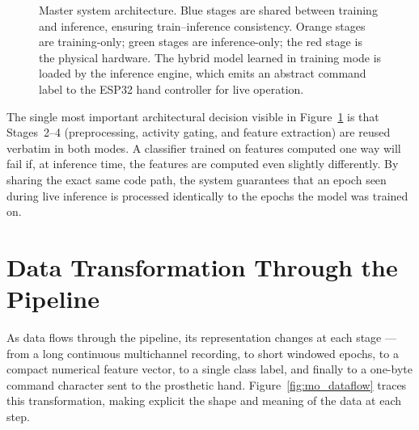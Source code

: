 \begin{figure}[htbp]
\caption{Master system architecture. Blue stages are shared between
training and inference, ensuring train--inference consistency.
Orange stages are training-only; green stages are inference-only;
the red stage is the physical hardware. The hybrid model learned in
training mode is loaded by the inference engine, which emits an
abstract command label to the ESP32 hand controller for live
operation.}
\label{fig:mo_master}
\end{figure}

The single most important architectural decision visible in
Figure~\ref{fig:mo_master} is that Stages~2--4 (preprocessing,
activity gating, and feature extraction) are reused verbatim in
both modes. A classifier trained on features computed one way will
fail if, at inference time, the features are computed even slightly
differently. By sharing the exact same code path, the system
guarantees that an epoch seen during live inference is processed
identically to the epochs the model was trained on.

\section{Data Transformation Through the Pipeline}
\label{sec:mo_dataflow}

As data flows through the pipeline, its representation changes at
each stage --- from a long continuous multichannel recording, to
short windowed epochs, to a compact numerical feature vector, to a
single class label, and finally to a one-byte command character
sent to the prosthetic hand. Figure~\ref{fig:mo_dataflow} traces
this transformation, making explicit the shape and meaning of the
data at each step.

